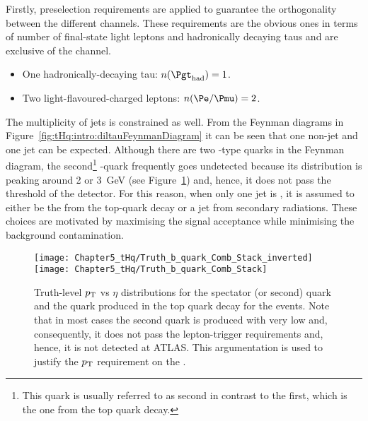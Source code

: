 Firstly, preselection requirements are applied to guarantee the orthogonality between the 
different \tHq channels. These requirements are the obvious ones in terms of number 
of final-state light leptons and hadronically decaying taus and are exclusive of the \dileptau channel.
\begin{itemize}
	\item One hadronically-decaying tau: $n(\tauhad)=1$.
	\item Two light-flavoured-charged leptons:  $n(\Pe / \Pmu)=2$.
\end{itemize}

The multiplicity of jets is constrained as well. From the Feynman diagrams 
in Figure~\ref{fig:tHq:intro:diltauFeynmanDiagram} it
can be seen that one non-\btagged jet and one \btagged jet can be expected. 
Although there are two \Pbottom-type quarks in the Feynman diagram,
the second\footnote{This quark is usually referred to as second \Pbottom in contrast to
the first, which is the one from the top quark decay.} 
\Pbottom-quark frequently goes undetected because its
\pT distribution is peaking around 2 or 3~GeV 
(see Figure~\ref{fig:tHq:pTvsEta_bQuark}) and, hence, it does
not pass the \pT threshold of the detector. 
For this reason, when only one jet is \btagged, 
it is assumed to either be the \Pbottom from the top-quark decay or a jet from secondary radiations.
These choices are motivated by maximising the signal acceptance while minimising the background contamination.

\begin{figure}[h]
\centering
\texttt{[image: Chapter5\_tHq/Truth\_b\_quark\_Comb\_Stack\_inverted]}
\texttt{[image: Chapter5\_tHq/Truth\_b\_quark\_Comb\_Stack]}

\caption{Truth-level $p_{\text{T}}$ vs $\eta$ distributions for the spectator (or second) \Pbottom quark and 
the \Pbottom quark produced in the top quark decay for the \tHq events.
Note that in most cases the second \Pbottom quark is produced with very low \pT and, consequently, it does not pass the 
lepton-trigger requirements and, hence, it is not detected at ATLAS. This argumentation is used
to justify the  $p_{\text{T}}$ requirement on the \bjets.}
\label{fig:tHq:pTvsEta_bQuark}
\end{figure}

